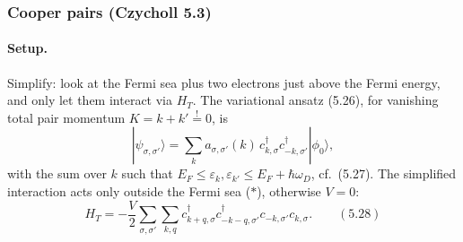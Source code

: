 \documentclass[../../main.tex]{subfiles}
\begin{document}
\subsubsection{Cooper pairs (Czycholl 5.3)}
\label{subsubsec:bcs-cooper-pairs_details}

\paragraph{Setup.}
Simplify: look at the Fermi sea plus two electrons just above the Fermi energy, and only
let them interact via $H_T$. The variational ansatz (5.26), for vanishing total pair
momentum $K=k+k'\overset{!}{=}0$, is
\begin{equation}
|\psi_{\sigma,\sigma'}\rangle=\sum_k a_{\sigma,\sigma'}(k)\,
c^\dagger_{k,\sigma}c^\dagger_{-k,\sigma'}|\phi_0\rangle ,
\end{equation}
with the sum over $k$ such that $E_F\le\varepsilon_k,\varepsilon_{k'}\le
E_F+\hbar\omega_D$, cf.\ (5.27). The simplified interaction acts only outside the Fermi
sea ($\ast$), otherwise $V=0$:
\begin{equation}
H_T=-\frac{V}{2}\sum_{\sigma,\sigma'}\sum_{k,q}
c^\dagger_{k+q,\sigma}c^\dagger_{-k-q,\sigma'}c_{-k,\sigma'}c_{k,\sigma}.
\qquad (5.28)
\end{equation}
\end{document}
